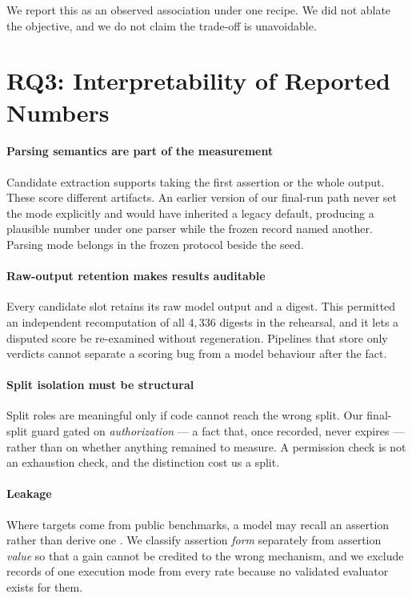 \documentclass[10pt,conference,letterpaper]{IEEEtran}
\begin{document}
We report this as an observed association under one recipe. We did not ablate
the objective, and we do not claim the trade-off is unavoidable.

\section{RQ3: Interpretability of Reported Numbers}
\label{sec:rq3}

\paragraph{Parsing semantics are part of the measurement}
Candidate extraction supports taking the first assertion or the whole output.
These score different artifacts. An earlier version of our final-run path never
set the mode explicitly and would have inherited a legacy default, producing a
plausible number under one parser while the frozen record named another. Parsing
mode belongs in the frozen protocol beside the seed.

\paragraph{Raw-output retention makes results auditable}
Every candidate slot retains its raw model output and a digest. This permitted
an independent recomputation of all $4{,}336$ digests in the rehearsal, and it
lets a disputed score be re-examined without regeneration. Pipelines that store
only verdicts cannot separate a scoring bug from a model behaviour after the
fact.

\paragraph{Split isolation must be structural}
Split roles are meaningful only if code cannot reach the wrong split. Our
final-split guard gated on \emph{authorization} --- a fact that, once recorded,
never expires --- rather than on whether anything remained to measure. A
permission check is not an exhaustion check, and the distinction cost us a
split.

\paragraph{Leakage}
Where targets come from public benchmarks, a model may recall an assertion
rather than derive one \cite{yang2023rephrased,kapoor2023leakage,liu2023evalplus}.
We classify assertion \emph{form} separately from assertion \emph{value} so that
a gain cannot be credited to the wrong mechanism, and we exclude records of one
execution mode from every rate because no validated evaluator exists for them.
\end{document}
